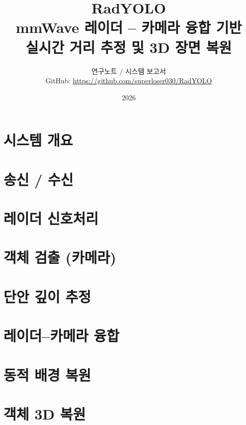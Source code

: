 \documentclass[11pt]{article}
\title{\textbf{RadYOLO}\\[4pt]
  \large mmWave 레이더 -- 카메라 융합 기반\\ 실시간 거리 추정 및 3D 장면 복원}
\author{연구노트 / 시스템 보고서\\[8pt]
  \normalsize GitHub: \url{https://github.com/superloser030/RadYOLO}}
\date{2026}
\begin{document}
\maketitle
\tableofcontents

\part{시스템 개요}


\part{송신 / 수신}


\part{레이더 신호처리}


\part{객체 검출 (카메라)}


\part{단안 깊이 추정}


\part{레이더--카메라 융합}


\part{동적 배경 복원}


\part{객체 3D 복원}

\end{document}
